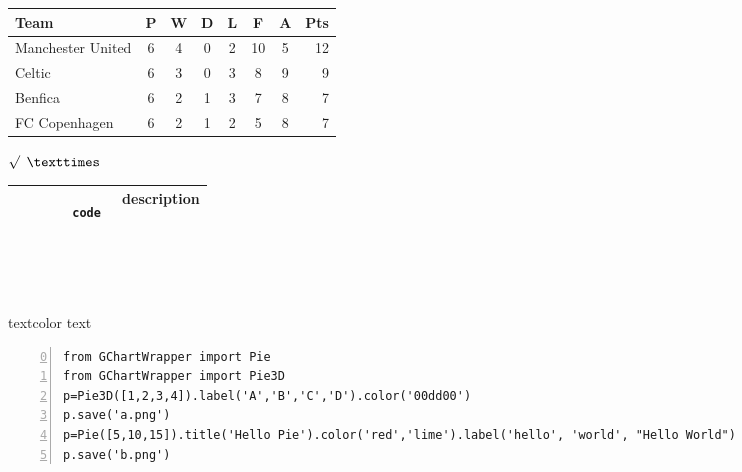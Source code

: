 \documentclass{ctexart}
\begin{document}
\begin{CJK*}{GBK}{song}
\begin{tabular}{l*{6}{c}r}
Team              & P & W & D & L & F  & A & Pts \\
\hline
Manchester United & 6 & 4 & 0 & 2 & 10 & 5 & 12  \\
Celtic            & 6 & 3 & 0 & 3 &  8 & 9 &  9  \\
Benfica           & 6 & 2 & 1 & 3 &  7 & 8 &  7  \\
FC Copenhagen     & 6 & 2 & 1 & 2 &  5 & 8 &  7  \\
\end{tabular}

${\surd}$ 
${\texttimes}$
\begin{tabular}{| p{5cm} | c |}
        \hline
        \begin{verbatim}
        code 
        \end{verbatim}
        & description
        \\ \hline
\end{tabular}
\\
\\
\\
\textcolor[rgb]{0.69,0.94,0.71}{textcolor text}

\renewcommand{\ttdefault}{pcr}

\begin{lstlisting}[frame=single,
                    framerule=1pt,
                    numbers=left,
                    firstnumber=0,
                    caption={Sample python source code},]
from GChartWrapper import Pie
from GChartWrapper import Pie3D
p=Pie3D([1,2,3,4]).label('A','B','C','D').color('00dd00')
p.save('a.png')
p=Pie([5,10,15]).title('Hello Pie').color('red','lime').label('hello', 'world', "Hello World")
p.save('b.png')
\end{lstlisting}



\end{CJK*}
\end{document}
